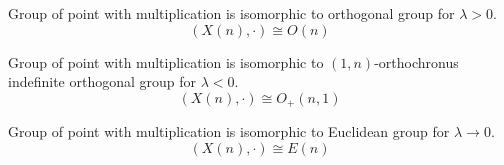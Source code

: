 \documentclass[../main.tex]{subfiles}
\begin{document}
\begin{proposition}
Group of point with multiplication is isomorphic to orthogonal group for \(\lambda>0\).
\[
\left(X\left(n\right),\cdot\right)\cong O\left(n\right)
\]
\end{proposition}
\begin{proposition}
Group of point with multiplication is isomorphic to \(\left(1,n\right)\)-orthochronus indefinite orthogonal group for \(\lambda<0\).
\[
\left(X\left(n\right),\cdot\right)\cong O_+\left(n,1\right)
\]
\end{proposition}
\begin{proposition}
Group of point with multiplication is isomorphic to Euclidean group for \(\lambda\to0\).
\[
\left(X\left(n\right),\cdot\right)\cong E\left(n\right)
\]
\end{proposition}
\end{document}
